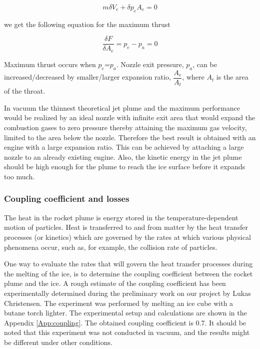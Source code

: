 \begin{equation}
m\delta V_e+\delta p_e A_e=0
\end{equation}

we get the following equation for the maximum thrust

\begin{equation}
\dfrac{\delta F}{\delta A_e}=p_e-p_a=0 
\end{equation}

Maximum thrust occurs when $p_e$=$p_a$. Nozzle exit pressure, $p_a$, can be increased/decreased by smaller/larger expansion ratio, $\dfrac{A_e}{A_t}$, where $A_t$ is the area of the throat. 

In vacuum the thinnest theoretical jet plume and the maximum performance would be realized by an ideal nozzle with infinite exit area that would expand the combustion gases to zero pressure thereby attaining the maximum gas velocity, limited to the area below the nozzle. Therefore the best result is obtained with an engine with a large expansion ratio. This can be achieved by attaching a large nozzle to an already existing engine. Also, the kinetic energy in the jet plume should be high enough for the plume to reach the ice surface before it expands too much. 


\subsubsection{Coupling coefficient and losses}
The heat in the rocket plume is energy stored in the temperature-dependent motion of particles. Heat is transferred to and from matter by the heat transfer processes (or kinetics) which are governed by the rates at which various physical phenomena occur, such as, for example, the collision rate of particles. 

One way to evaluate the rates that will govern the heat transfer processes during the melting of the ice, is to determine the coupling coefficient between the rocket plume and the ice. A rough estimate of the coupling coefficient has been experimentally determined during the preliminary work on our project by Lukas Christensen. The experiment was performed by melting an ice cube with a butane torch lighter. The experimental setup and calculations are shown in the Appendix \ref{App:coupling}. The obtained coupling coefficient is 0.7. It should be noted that this experiment was not conducted in vacuum, and the results might be different under other conditions. \\

